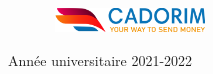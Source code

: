 \documentclass[a4paper, 12pt]{report}
\begin{document}
\begin{titlepage}
\begin{center}
			
		\end{center}
		\begin{figure}[htbp]
		\hbox{
			\hspace*{5cm}
			\includegraphics[width=150px]{./Template LaTeX/Images/cado_logo.png}
		}
		\end{figure}
		\vspace{2cm}
		\begin{center}
			Année universitaire 2021-2022
		\end{center}
	\end{titlepage}
\end{document}
